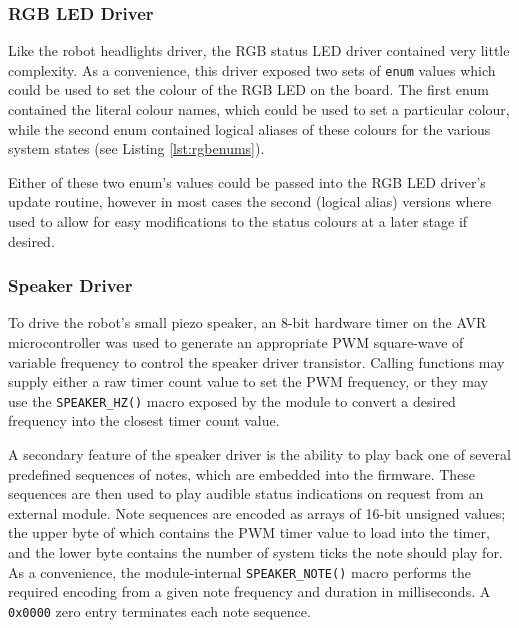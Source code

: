 \FloatBarrier
\subsubsection{RGB LED Driver}

Like the robot headlights driver, the RGB status LED driver contained very little complexity. As a convenience, this driver exposed two sets of \lstinline{enum} values which could be used to set the colour of the RGB LED on the board. The first enum contained the literal colour names, which could be used to set a particular colour, while the second enum contained logical aliases of these colours for the various system states (see Listing \ref{lst:rgbenums}).



Either of these two enum's values could be passed into the RGB LED driver's update routine, however in most cases the second (logical alias) versions where used to allow for easy modifications to the status colours at a later stage if desired.

\FloatBarrier
\subsubsection{Speaker Driver}

To drive the robot's small piezo speaker, an 8-bit hardware timer on the AVR microcontroller was used to generate an appropriate PWM square-wave of variable frequency to control the speaker driver transistor. Calling functions may supply either a raw timer count value to set the PWM frequency, or they may use the \lstinline{SPEAKER_HZ()} macro exposed by the module to convert a desired frequency into the closest timer count value.

A secondary feature of the speaker driver is the ability to play back one of several predefined sequences of notes, which are embedded into the firmware. These sequences are then used to play audible status indications on request from an external module. Note sequences are encoded as arrays of 16-bit unsigned values; the upper byte of which contains the PWM timer value to load into the timer, and the lower byte contains the number of system ticks the note should play for. As a convenience, the module-internal \lstinline{SPEAKER_NOTE()} macro performs the required encoding from a given note frequency and duration in milliseconds. A \lstinline{0x0000} zero entry terminates each note sequence.

